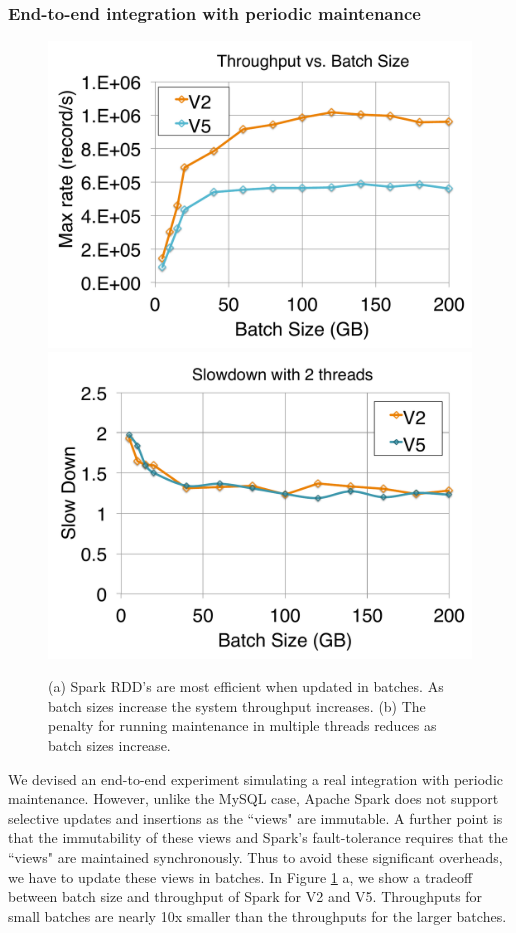 \subsubsection{End-to-end integration with periodic maintenance}
\begin{figure}[t]
\centering
 \includegraphics[scale=0.14]{exp/con_3.pdf}
 \includegraphics[scale=0.14]{exp/con_4.pdf}
 \caption{(a) Spark RDD's are most efficient when updated in batches. As batch sizes increase the system throughput increases. (b) The penalty for running maintenance in multiple threads reduces as batch sizes increase. \label{conv-2}}
\end{figure}

We devised an end-to-end experiment simulating a real integration with periodic maintenance.
However, unlike the MySQL case, Apache Spark does not support selective updates and insertions as the ``views" are immutable.
A further point is that the immutability of these views and Spark's fault-tolerance requires that the ``views" are maintained synchronously.
Thus to avoid these significant overheads, we have to update these views in batches.
In Figure \ref{conv-2} a, we show a tradeoff between batch size and throughput of Spark for V2 and V5.
Throughputs for small batches are nearly 10x smaller than the throughputs for the larger batches.


